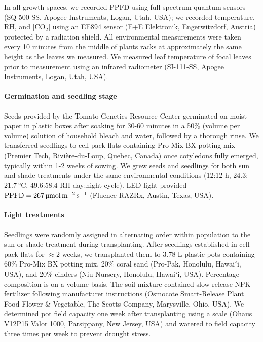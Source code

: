 \documentclass[
  letterpaper,
  DIV=11,
  numbers=noendperiod]{scrartcl}
\let\oldparagraph\paragraph
\renewcommand{\paragraph}[1]{\oldparagraph{#1}\mbox{}}
\begin{document}
In all growth spaces, we recorded \(\mathrm{PPFD}\) using full spectrum
quantum sensors (SQ-500-SS, Apogee Instruments, Logan, Utah, USA); we
recorded temperature, RH, and {[}CO\(_2\){]} using an EE894 sensor (E+E
Elektronik, Engerwitzdorf, Austria) protected by a radiation shield. All
environmental measurements were taken every 10 minutes from the middle
of plants racks at approximately the same height as the leaves we
measured. We measured leaf temperature of focal leaves prior to
measurement using an infrared radiometer (SI-111-SS, Apogee Instruments,
Logan, Utah, USA).

\paragraph{Germination and seedling
stage}\label{germination-and-seedling-stage}

Seeds provided by the Tomato Genetics Resource Center germinated on
moist paper in plastic boxes after soaking for 30-60 minutes in a 50\%
(volume per volume) solution of household bleach and water, followed by
a thorough rinse. We transferred seedlings to cell-pack flats containing
Pro-Mix BX potting mix (Premier Tech, Rivière-du-Loup, Quebec, Canada)
once cotyledons fully emerged, typically within 1-2 weeks of sowing. We
grew seeds and seedlings for both sun and shade treatments under the
same environmental conditions (12:12 h,
24.3:\(\qty{21.7}{\degreeCelsius}\), 49.6:58.4 RH day:night cycle). LED
light provided
\(\mathrm{PPFD} = \qty{267}{\micro\mol\raiseto{-2}\meter\raiseto{-1}\second}\)
(Fluence RAZRx, Austin, Texas, USA).

\paragraph{Light treatments}\label{light-treatments}

Seedlings were randomly assigned in alternating order within population
to the sun or shade treatment during transplanting. After seedlings
established in cell-pack flats for \(\approx 2\) weeks, we transplanted
them to 3.78 L plastic pots containing 60\% Pro-Mix BX potting mix, 20\%
coral sand (Pro-Pak, Honolulu, Hawaiʻi, USA), and 20\% cinders (Niu
Nursery, Honolulu, Hawaiʻi, USA). Percentage composition is on a volume
basis. The soil mixture contained slow release NPK fertilizer following
manufacturer instructions (Osmocote Smart-Release Plant Food Flower \&
Vegetable, The Scotts Company, Marysville, Ohio, USA). We determined pot
field capacity one week after transplanting using a scale (Ohaus V12P15
Valor 1000, Parsippany, New Jersey, USA) and watered to field capacity
three times per week to prevent drought stress.
\end{document}
